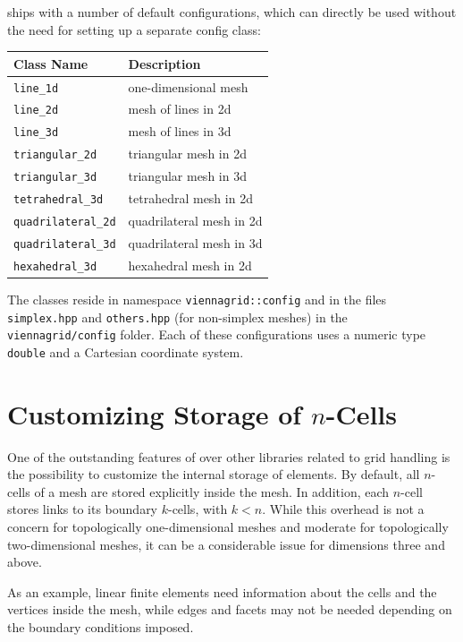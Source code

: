 {\ViennaGrid} ships with a number of default configurations, which can directly be used without the need for setting up a separate config class:
\begin{center}
 \begin{tabular}{|l|l|}
  \hline
   Class Name           & Description \\
  \hline
   \lstinline|line_1d|  & one-dimensional mesh \\
   \lstinline|line_2d|  & mesh of lines in 2d \\
   \lstinline|line_3d|  & mesh of lines in 3d \\
   \lstinline|triangular_2d| & triangular mesh in 2d \\
   \lstinline|triangular_3d| & triangular mesh in 3d \\
   \lstinline|tetrahedral_3d| & tetrahedral mesh in 2d \\
   \lstinline|quadrilateral_2d| & quadrilateral mesh in 2d \\
   \lstinline|quadrilateral_3d| & quadrilateral mesh in 3d \\
   \lstinline|hexahedral_3d| & hexahedral mesh in 2d \\
  \hline
 \end{tabular}
\end{center}
The classes reside in namespace \lstinline|viennagrid::config| and in the files \lstinline|simplex.hpp| and \lstinline|others.hpp| (for non-simplex meshes) in the \lstinline|viennagrid/config| folder.
Each of these configurations uses a numeric type \lstinline|double| and a Cartesian coordinate system.

\section{Customizing Storage of $n$-Cells} \label{sec:customizing-storage}
One of the outstanding features of {\ViennaGrid} over other libraries related to grid handling is the possibility to customize the internal storage of elements. By default, all $n$-cells of a mesh are stored explicitly inside the mesh. In addition, each $n$-cell stores links to its boundary $k$-cells, with $k<n$. While this overhead is not a concern for topologically one-dimensional meshes and moderate for topologically two-dimensional meshes, it can be a considerable issue for dimensions three and above.

As an example, linear finite elements need information about the cells and the vertices inside the mesh, while edges and facets may not be needed depending on the boundary conditions imposed.

